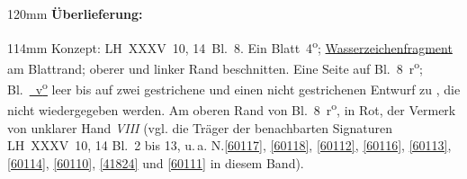 \begin{ledgroupsized}[r]{120mm}
\footnotesize
\pstart
\noindent\textbf{Überlieferung:}
\pend
\end{ledgroupsized}
\begin{ledgroupsized}[r]{114mm}
\footnotesize
\pstart
\parindent -6mm
%
Konzept:
LH~XXXV~10, 14~Bl.~8. 
Ein Blatt~4\textsuperscript{o};
\href{\Scan{LH_35_10_14_008wz}}%
{Wasserzeichenfragment} am Blattrand;
oberer und linker Rand beschnitten.
Eine Seite auf Bl.~8~r\textsuperscript{o}; 
Bl.~\href{\Scan{LH_35_10_14_008v}}%
{~v\textsuperscript{o}\rbrack}
leer bis auf zwei gestrichene und einen nicht gestrichenen Entwurf zu , die nicht wiedergegeben werden.
Am oberen Rand von Bl.~8~r\textsuperscript{o}, in Rot, der Vermerk von unklarer Hand \textit{VIII}
(vgl. die Träger der benachbarten Signaturen LH~XXXV~10, 14 Bl.~2 bis 13, u.\,a. 
N.\;\ref{60117},
\ref{60118},
\ref{60112},
\ref{60116},
\ref{60113},
\ref{60114},
\ref{60110},
\ref{41824}
und \ref{60111}
in diesem Band).
\pend
\end{ledgroupsized}
\vspace{5mm}
